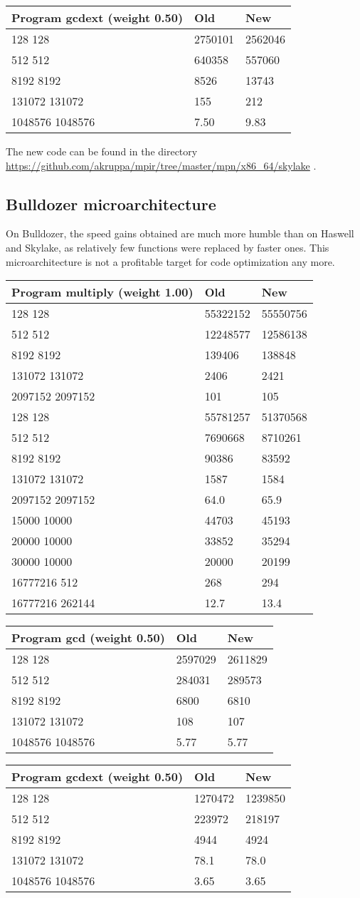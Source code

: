\begin{longtable}[c]{@{}lll@{}}
\toprule
Program gcdext (weight 0.50) & Old & New\tabularnewline
\midrule
\endhead
128 128 & 2750101 & 2562046\tabularnewline
512 512 & 640358 & 557060\tabularnewline
8192 8192 & 8526 & 13743\tabularnewline
131072 131072 & 155 & 212\tabularnewline
1048576 1048576 & 7.50 & 9.83\tabularnewline
\bottomrule
\end{longtable}

The new code can be found in the directory
\url{https://github.com/akruppa/mpir/tree/master/mpn/x86_64/skylake} .

\subsection{Bulldozer
microarchitecture}\label{bulldozer-microarchitecture}

On Bulldozer, the speed gains obtained are much more humble than on
Haswell and Skylake, as relatively few functions were replaced by faster
ones. This microarchitecture is not a profitable target for code
optimization any more.

\begin{longtable}[c]{@{}lll@{}}
\toprule
Program multiply (weight 1.00) & Old & New\tabularnewline
\midrule
\endhead
128 128 & 55322152 & 55550756\tabularnewline
512 512 & 12248577 & 12586138\tabularnewline
8192 8192 & 139406 & 138848\tabularnewline
131072 131072 & 2406 & 2421\tabularnewline
2097152 2097152 & 101 & 105\tabularnewline
128 128 & 55781257 & 51370568\tabularnewline
512 512 & 7690668 & 8710261\tabularnewline
8192 8192 & 90386 & 83592\tabularnewline
131072 131072 & 1587 & 1584\tabularnewline
2097152 2097152 & 64.0 & 65.9\tabularnewline
15000 10000 & 44703 & 45193\tabularnewline
20000 10000 & 33852 & 35294\tabularnewline
30000 10000 & 20000 & 20199\tabularnewline
16777216 512 & 268 & 294\tabularnewline
16777216 262144 & 12.7 & 13.4\tabularnewline
\bottomrule
\end{longtable}

\begin{longtable}[c]{@{}lll@{}}
\toprule
Program gcd (weight 0.50) & Old & New\tabularnewline
\midrule
\endhead
128 128 & 2597029 & 2611829\tabularnewline
512 512 & 284031 & 289573\tabularnewline
8192 8192 & 6800 & 6810\tabularnewline
131072 131072 & 108 & 107\tabularnewline
1048576 1048576 & 5.77 & 5.77\tabularnewline
\bottomrule
\end{longtable}

\begin{longtable}[c]{@{}lll@{}}
\toprule
Program gcdext (weight 0.50) & Old & New\tabularnewline
\midrule
\endhead
128 128 & 1270472 & 1239850\tabularnewline
512 512 & 223972 & 218197\tabularnewline
8192 8192 & 4944 & 4924\tabularnewline
131072 131072 & 78.1 & 78.0\tabularnewline
1048576 1048576 & 3.65 & 3.65\tabularnewline
\bottomrule
\end{longtable}

